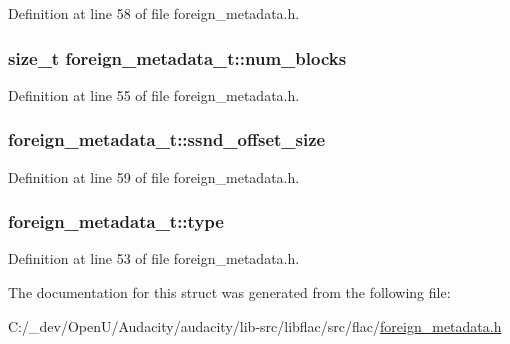 Definition at line 58 of file foreign\+\_\+metadata.\+h.

\subsubsection[{\texorpdfstring{num\+\_\+blocks}{num_blocks}}]{\setlength{\rightskip}{0pt plus 5cm}size\+\_\+t foreign\+\_\+metadata\+\_\+t\+::num\+\_\+blocks}\hypertarget{structforeign__metadata__t_a6854978c03874ceb004b3e88959b8018}{}\label{structforeign__metadata__t_a6854978c03874ceb004b3e88959b8018}


Definition at line 55 of file foreign\+\_\+metadata.\+h.

\subsubsection[{\texorpdfstring{ssnd\+\_\+offset\+\_\+size}{ssnd_offset_size}}]{ foreign\+\_\+metadata\+\_\+t\+::ssnd\+\_\+offset\+\_\+size}\hypertarget{structforeign__metadata__t_a3ac3ad5aa6de385e40fd26a6d50a9480}{}\label{structforeign__metadata__t_a3ac3ad5aa6de385e40fd26a6d50a9480}


Definition at line 59 of file foreign\+\_\+metadata.\+h.

\subsubsection[{\texorpdfstring{type}{type}}]{ foreign\+\_\+metadata\+\_\+t\+::type}\hypertarget{structforeign__metadata__t_a580272758c516f16a07dd15fc754ec3e}{}\label{structforeign__metadata__t_a580272758c516f16a07dd15fc754ec3e}


Definition at line 53 of file foreign\+\_\+metadata.\+h.



The documentation for this struct was generated from the following file\+:\begin{DoxyCompactItemize}
\item 
C\+:/\+\_\+dev/\+Open\+U/\+Audacity/audacity/lib-\/src/libflac/src/flac/\hyperlink{foreign__metadata_8h}{foreign\+\_\+metadata.\+h}\end{DoxyCompactItemize}
